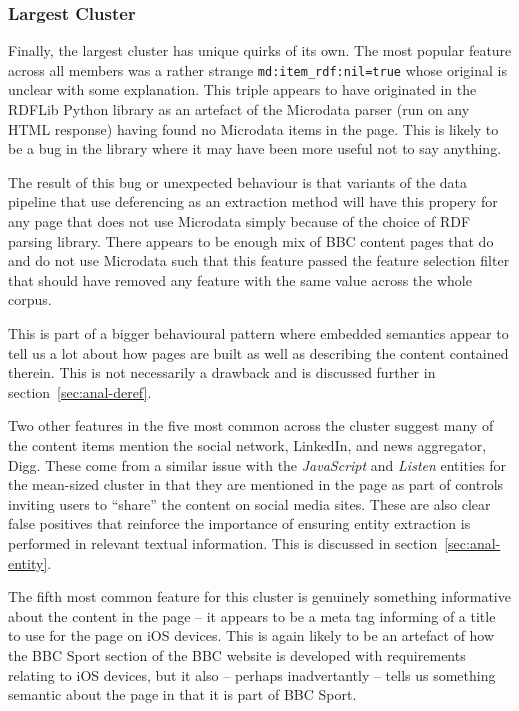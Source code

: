\subsubsection{Largest Cluster}

Finally, the largest cluster has unique quirks of its own. The most
popular feature across all members was a rather strange
\texttt{md:item\_rdf:nil=true} whose original is unclear with some
explanation. This triple appears to have originated in the RDFLib
Python library as an artefact of the Microdata parser (run on any
HTML response) having found no Microdata items in the page. This is
likely to be a bug in the library where it may have been more useful
not to say anything.

The result of this bug or unexpected behaviour is that variants
of the data pipeline that use deferencing as an extraction method will
have this propery for any page that does not use Microdata simply
because of the choice of RDF parsing library. There appears to be
enough mix of BBC content pages that do and do not use Microdata such
that this feature passed the feature selection filter that should
have removed any feature with the same value across the whole corpus.

This is part of a bigger behavioural pattern where embedded semantics
appear to tell us a lot about how pages are built as well as
describing the content contained therein. This is not necessarily a
drawback and is discussed further in section~\ref{sec:anal-deref}.

Two other features in the five most common across the cluster suggest
many of the content items mention the social network, LinkedIn, and
news aggregator, Digg. These come from a similar issue with the
\emph{JavaScript} and \emph{Listen} entities for the mean-sized
cluster in that they are mentioned in the page as part of controls
inviting users to ``share'' the content on social media sites. These
are also clear false positives that reinforce the importance of
ensuring entity extraction is performed in relevant textual
information. This is discussed in section~\ref{sec:anal-entity}.

The fifth most common feature for this cluster is genuinely something
informative about the content in the page -- it appears to be a meta
tag informing of a title to use for the page on iOS devices. This is
again likely to be an artefact of how the BBC Sport section of the
BBC website is developed with requirements relating to iOS devices,
but it also -- perhaps inadvertantly -- tells us something semantic
about the page in that it is part of BBC Sport.

